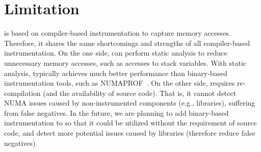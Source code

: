 \section{Limitation}
\label{sec:discussion}
\NP{} is based on compiler-based instrumentation to capture memory accesses. Therefore, it shares the same shortcomings and strengths of all compiler-based instrumentation. On the one side, \NP{} can perform static analysis to reduce unnecessary memory accesses, such as accesses to stack variables. With static analysis, \NP{} typically achieves much better performance than binary-based instrumentation tools, such as NUMAPROF~\cite{valat:2018:numaprof}. On the other side, \NP{} requires re-compilation (and the availability of source code). That is, it cannot detect NUMA issues caused by non-instrumented components (e.g., libraries), suffering from false negatives. 
In the future, we are planning to add binary-based instrumentation to \NP{} so that it could be utilized without the requirement of source code, and detect more potential issues caused by libraries (therefore reduce false negatives). 


